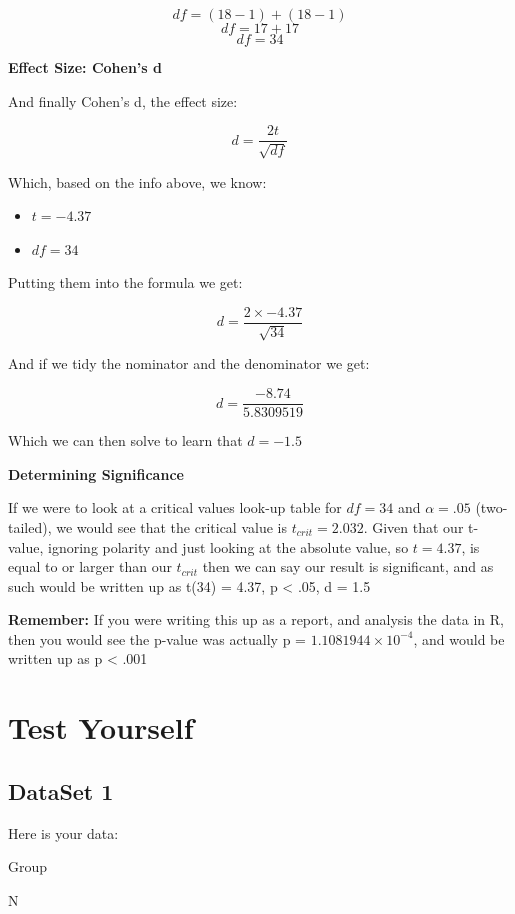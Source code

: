 \documentclass[
  oneside]{book}
\providecommand{\tightlist}{%
  \setlength{\itemsep}{0pt}\setlength{\parskip}{0pt}}
\begin{document}
\[df = (18 - 1) + (18 - 1)\]
\[df = 17 + 17\]
\[df = 34\]

\textbf{Effect Size: Cohen's d}

And finally Cohen's d, the effect size:

\[d = \frac{2t}{\sqrt{df}}\]

Which, based on the info above, we know:

\begin{itemize}
\tightlist
\item
  \(t = -4.37\)
\item
  \(df = 34\)
\end{itemize}

Putting them into the formula we get:

\[d = \frac{2 \times -4.37}{\sqrt{34}}\]

And if we tidy the nominator and the denominator we get:

\[d = \frac{-8.74}{5.8309519}\]

Which we can then solve to learn that \(d = -1.5\)

\textbf{Determining Significance}

If we were to look at a critical values look-up table for \(df = 34\) and \(\alpha = .05\) (two-tailed), we would see that the critical value is \(t_{crit} = 2.032\). Given that our t-value, ignoring polarity and just looking at the absolute value, so \(t = 4.37\), is equal to or larger than our \(t_{crit}\) then we can say our result is significant, and as such would be written up as t(34) = 4.37, p \textless{} .05, d = 1.5

\textbf{Remember:} If you were writing this up as a report, and analysis the data in R, then you would see the p-value was actually p = \ensuremath{1.1081944\times 10^{-4}}, and would be written up as p \textless{} .001

\hypertarget{test-yourself-2}{%
\section{Test Yourself}\label{test-yourself-2}}

\hypertarget{dataset-1-2}{%
\subsection{DataSet 1}\label{dataset-1-2}}

Here is your data:

Group

N
\end{document}
